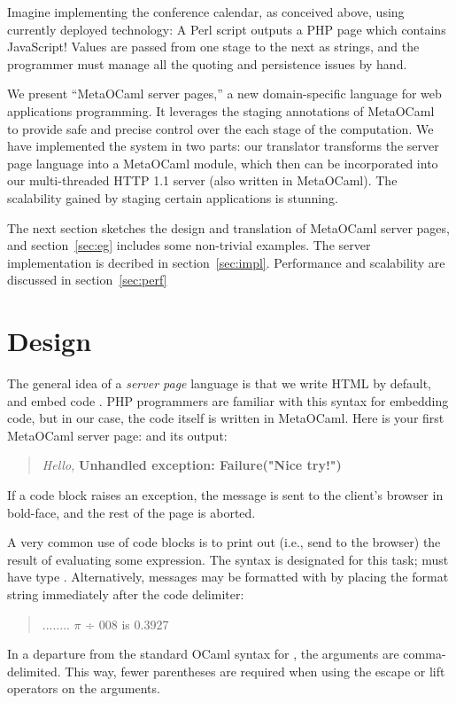 \documentclass[preprint]{acm_proc_article-sp}
\def\MOC{MetaOCaml\xspace}
\begin{document}
Imagine implementing the conference calendar, as conceived
above, using currently deployed technology: A Perl script
outputs a PHP page which contains JavaScript!  Values are
passed from one stage to the next as strings, and the
programmer must manage all the quoting and persistence
issues by hand.

We present ``\MOC server pages,'' a new domain-specific
language for web applications programming.  It leverages the
staging annotations of \MOC~\cite{calcagno03meta,taha00metaml}
to provide safe and precise control over the each stage of the
computation.  We have implemented the system in two parts: our
translator transforms the server page language into a \MOC
module, which then can be incorporated into our multi-threaded
HTTP 1.1 server (also written in \MOC).  The scalability
gained by staging certain applications is stunning.

The next section sketches the design and translation of \MOC
server pages, and section~\ref{sec:eg} includes some non-trivial
examples.  The server implementation is decribed in
section~\ref{sec:impl}.  Performance and scalability are
discussed in section~\ref{sec:perf}

\section{Design}
\label{sec:design}

The general idea of a \emph{server page} language is that we
  write HTML by default, and embed code %
.
PHP programmers are familiar with this syntax for embedding code, but
in our case, the code itself is written in \MOC.  Here is your first
\MOC server page:
and its output:
\begin{quote}
  \textit{Hello,} \textbf{Unhandled exception: Failure("Nice try!")}
\end{quote}
If a code block raises an exception, the message is sent to the
client's browser in bold-face, and the rest of the page is
aborted. 

A very common use of code blocks is to print out (i.e., send to
the browser) the result of evaluating some expression.  The
syntax  is designated for this task;  must
have type .  Alternatively, messages may be formatted
with  by placing the format string immediately after
the code delimiter: 
\begin{quote}
  ........ $\pi$ ÷ 008 is 0.3927
\end{quote}
In a departure from the standard OCaml syntax for , the
arguments are comma-delimited.  This way, fewer parentheses are
required when using the escape or lift operators on the arguments.
\end{document}
